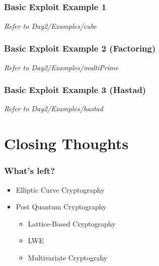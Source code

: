 \documentclass{beamer}
\begin{document}
\subsection{}
\begin{frame}
  \frametitle{Basic Exploit Example 1} 
  \emph{Refer to Day2/Examples/cube}
\end{frame}

\begin{frame}
  \frametitle{Basic Exploit Example 2 (Factoring)}
  \emph{Refer to Day2/Examples/multiPrime}
\end{frame}

\begin{frame}
  \frametitle{Basic Exploit Example 3 (Hastad)}
  \emph{Refer to Day2/Examples/hastad}
\end{frame}

\section{Closing Thoughts}
\begin{frame}
    \frametitle{What's left?}
    \begin{itemize}
    	\item Elliptic Curve Cryptography
       	\item Post Quantum Cryptography
    	\begin{itemize}
    		\item Lattice-Based Cryptography
    		\item LWE
    		\item Multivariate Cryptograhy
    	\end{itemize}
    \end{itemize}
\end{frame} 
\end{document}
